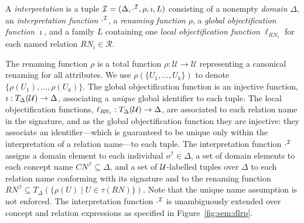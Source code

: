 \documentclass[draft]{article}
\newcommand{\nb}[1]{\todo[color=red]{#1}\xspace}
\renewcommand\dom{\ensuremath{\Delta}\xspace}
\begin{document}
A \DLRp \emph{interpretation} is a tuple $\Imc = (\dom, \cdot^\Imc, \rho, \imath, L)$ consisting of a nonempty 
\emph{domain} $\dom$, an \emph{interpretation function} $\cdot^\mathcal{I}$, a \emph{renaming function} $\rho$, a \emph{global objectification function} $\imath$, and a family $L$ containing one \emph{local objectification function} 
$\ell_{R\!N_i}$ for each named relation $R\!N_i\in\mathcal{R}$.

The renaming function $\rho$ is a total function ${\rho:\mathcal{U}\to\mathcal{U}}$ representing a canonical renaming 
for all attributes. We use $\rho(\{U_1,\ldots,U_k\})$  to denote $\{\rho(U_1),\ldots,\rho(U_k)\}$.
%
The global objectification function is an injective function, ${\imath:T_{\dom}(\Umc) \to \dom}$, associating a \emph{unique} global identifier to each tuple.
%
The local objectification functions, ${\ell_{R\!N_i}:T_{\dom}(\Umc) \to \dom}$, are associated to each relation name in the signature, and as the global objectification function they are injective: they associate an identifier---which is guaranteed to be unique only within the interpretation of a relation name---to each tuple.
The interpretation function $\cdot^\mathcal{I}$ assigns a domain element to each individual $o^{\mathcal{I}}\in\dom$, a set of domain elements to each concept name $C\!N^{\mathcal{I}}\subseteq \dom$, and a set of $\mathcal{U}$-labelled tuples over $\dom$ to each relation name conforming with its signature and to the renaming function $R\!N^{\mathcal{I}}\subseteq T_{\dom}(\{\rho(U)\mid U\in\tau(R\!N)\})$. Note that the unique name assumption is not enforced.
%
The interpretation function $\cdot^\mathcal{I}$ is unambiguously extended over concept and relation expressions as specified in Figure~\ref{fig:sem:dlrp}.%
%
\end{document}
